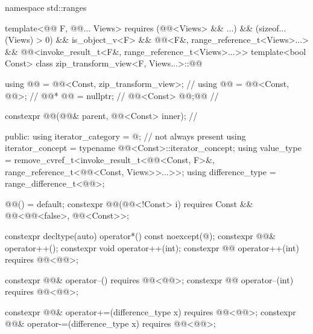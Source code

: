 \begin{codeblock}
namespace std::ranges {
  template<@@ F, @@... Views>
    requires (@@<Views> && ...) && (sizeof...(Views) > 0) && is_object_v<F> &&
              @@<F&, range_reference_t<Views>...> &&
              @@<invoke_result_t<F&, range_reference_t<Views>...>>
  template<bool Const>
  class zip_transform_view<F, Views...>::@@ {
    using @@ = @@<Const, zip_transform_view>;      // \expos
    using @@ = @@<Const, @@>;                 // \expos
    @@* @@ = nullptr;                                  // \expos
    @@<Const> @@;@\itcorr[-1]@                                    // \expos

    constexpr @@(@@& parent, @@<Const> inner);   // \expos

  public:
    using iterator_category = @\seebelownc@;                        // not always present
    using iterator_concept  = typename @@<Const>::iterator_concept;
    using value_type =
      remove_cvref_t<invoke_result_t<@@<Const, F>&,
                                     range_reference_t<@@<Const, Views>>...>>;
    using difference_type = range_difference_t<@@>;

    @@() = default;
    constexpr @@(@@<!Const> i)
      requires Const && @@<@@<false>, @@<Const>>;

    constexpr decltype(auto) operator*() const noexcept(@\seebelow@);
    constexpr @@& operator++();
    constexpr void operator++(int);
    constexpr @@ operator++(int) requires @@<@@>;

    constexpr @@& operator--() requires @@<@@>;
    constexpr @@ operator--(int) requires @@<@@>;

    constexpr @@& operator+=(difference_type x) requires @@<@@>;
    constexpr @@& operator-=(difference_type x) requires @@<@@>;

}}
\end{codeblock}
